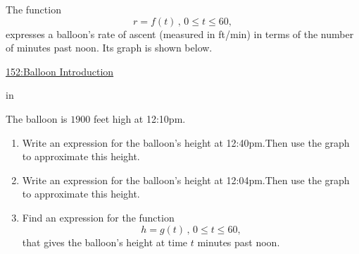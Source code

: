 \documentclass{ximera}
\newcommand{\pskip}{\vskip 0.1 in}
\begin{document}
\begin{question} \label{EUERr3rDR}
The function 
\[
    r = f(t) \, , \, 0\leq t \leq  60 , 
\]
expresses a balloon's rate of ascent (measured in ft/min) in terms of the number of minutes past noon. Its graph is shown below.

\begin{onlineOnly}
    \begin{center}
\end{center}
\end{onlineOnly}

\href{https://www.desmos.com/calculator/tgi5yiuzab}{152:Balloon Introduction}

\pskip

The balloon is $1900$ feet high at 12:10pm.

\begin{enumerate}
\item Write an expression for the balloon's height at 12:40pm.Then use the graph to approximate this height.

\item Write an expression for the balloon's height at 12:04pm.Then use the graph to approximate this height.

\item Find an expression for the function 
\[
         h=g(t) \, , \, 0\leq t \leq 60, 
\]
that gives the balloon's height at time $t$ minutes past noon.
\end{enumerate}
\end{question}
\end{document}
